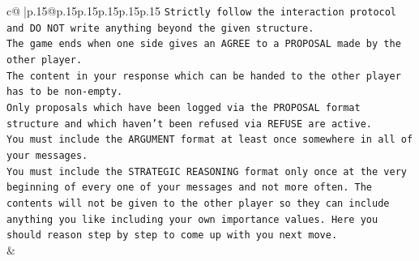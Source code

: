 \documentclass{article}
\begin{document}
{\begin{supertabular}{c@{$\;$}|p{.15\linewidth}@{}p{.15\linewidth}p{.15\linewidth}p{.15\linewidth}p{.15\linewidth}p{.15\linewidth}}
{{{\texttt{Strictly follow the interaction protocol and DO NOT write anything beyond the given structure.} \\
\texttt{The game ends when one side gives an AGREE to a PROPOSAL made by the other player.} \\
\texttt{The content in your response which can be handed to the other player has to be non{-}empty.} \\
\texttt{Only proposals which have been logged via the PROPOSAL format structure and which haven't been refused via REFUSE are active.} \\
\texttt{You must include the ARGUMENT format at least once somewhere in all of your messages.} \\
\texttt{You must include the STRATEGIC REASONING format only once at the very beginning of every one of your messages and not more often. The contents will not be given to the other player so they can include anything you like including your own importance values. Here you should reason step by step to come up with you next move.} \\
            }
        }
    }
    & \\ \\


\end{supertabular}}
\end{document}
